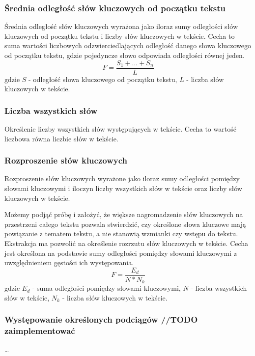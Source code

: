 \documentclass{classrep}
\begin{document}
\subsubsection{Średnia odległość słów kluczowych od początku tekstu}
Średnia odległość słów kluczowych wyrażona jako iloraz sumy odległości słów kluczowych od początku tekstu i liczby
słów kluczowych w tekście. Cecha to suma wartości liczbowych odzwierciedlających odległość danego słowa kluczowego
od początku tekstu, gdzie pojedyncze słowo odpowiada odległości równej jeden.
\begin{equation}
    F=\frac{S_{1} + ... + S_{n}}{L}
\end{equation}
gdzie $S$ - odległość słowa kluczowego od początku tekstu, $L$ -  liczba słów kluczowych w tekście.



\subsubsection{Liczba wszystkich słów}
Określenie liczby wszystkich słów występujących w tekście. 
Cecha to wartość liczbowa równa liczbie słów w tekście.

\subsubsection{Rozproszenie słów kluczowych}
Rozproszenie słów kluczowych wyrażone jako iloraz sumy odległości pomiędzy słowami kluczowymi i iloczyn liczby
wszystkich słów w tekście oraz liczby słów kluczowych w tekście.

Możemy podjąć próbę i założyć, że większe nagromadzenie słów kluczowych na przestrzeni całego tekstu pozwala
stwierdzić, czy określone słowa kluczowe mają powiązanie z tematem tekstu, a nie stanowią wzmianki czy wstępu do
tekstu. Ekstrakcja ma pozwolić na określenie rozrzutu słów kluczowych w tekście. Cecha jest określona na podstawie
sumy odległości pomiędzy słowami kluczowymi z uwzględnieniem gęstości ich występowania.
\begin{equation}
    F=\frac{E_{d}}{N*N_{k}}
\end{equation}
gdzie $E_{d}$ - suma odległości pomiędzy słowami kluczowymi, $N$ - liczba wszystkich słów w tekście,
$N_{k}$ - liczba słów kluczowych w tekście.



\subsubsection{Występowanie określonych podciągów //TODO zaimplementować}
\dots
\end{document}
